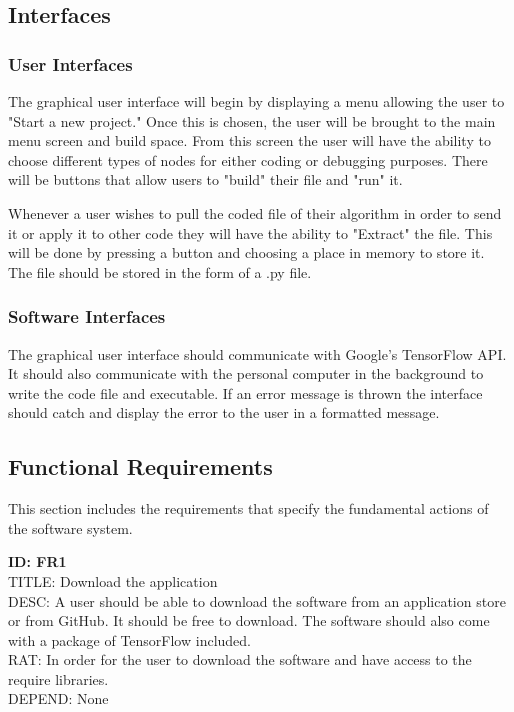 \documentclass[a4paper,10pt]{article} \usepackage[margin=1.0in]{geometry} \usepackage{pdfpages} \usepackage{graphicx}
\begin{document}
\subsection{Interfaces}
\subsubsection{User Interfaces}

The graphical user interface will begin by displaying a menu allowing the user to "Start a new project."
Once this is chosen, the user will be brought to the main menu screen and build space.
From this screen the user will have the ability to choose different types of nodes for either coding or debugging purposes.
There will be buttons that allow users to "build" their file and "run" it.

Whenever a user wishes to pull the coded file of their algorithm in order to send it or apply it to other code they will have the ability to "Extract" the file.
This will be done by pressing a button and choosing a place in memory to store it. 
The file should be stored in the form of a .py file.

\subsubsection{Software Interfaces}

The graphical user interface should communicate with Google's TensorFlow API.
It should also communicate with the personal computer in the background to write the code file and executable.
If an error message is thrown the interface should catch and display the error to the user in a formatted message.

\subsection{Functional Requirements}

This section includes the requirements that specify the fundamental actions of the software system.

\noindent
\textbf{ID: FR1}\\
TITLE: Download the application\\
DESC: A user should be able to download the software from an application store or from GitHub. It should be free to download. 
The software should also come with a package of TensorFlow included.\\
RAT: In order for the user to download the software and have access to the require libraries.\\
DEPEND: None\\
\end{document}
